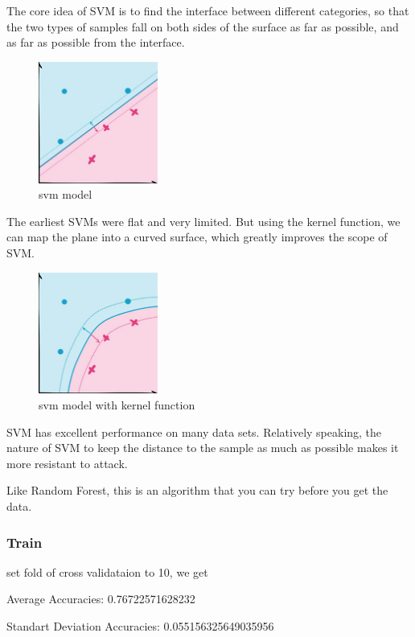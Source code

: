 \documentclass[11pt,en]{elegantpaper}
\begin{document}
The core idea of ​​SVM is to find the interface between different categories, so that the two types of samples fall on both sides of the surface as far as possible, and as far as possible from the interface.
\begin{figure}[H]
    \centering
    \includegraphics[width=0.35\textwidth]{figure/svm-model.jpg}
    \caption{svm model}
\end{figure}
The earliest SVMs were flat and very limited. But using the kernel function, we can map the plane into a curved surface, which greatly improves the scope of SVM.
\begin{figure}[H]
    \centering
    \includegraphics[width=0.35\textwidth]{figure/svm-model2.jpg}
    \caption{svm model with kernel function}
\end{figure}

SVM has excellent performance on many data sets. Relatively speaking, the nature of SVM to keep the distance to the sample as much as possible makes it more resistant to attack.

Like Random Forest, this is an algorithm that you can try before you get the data.

\subsubsection{Train}
set fold of cross validataion to 10, we get

Average Accuracies:  0.76722571628232

Standart Deviation Accuracies:  0.055156325649035956
\end{document}
